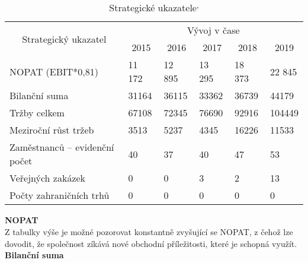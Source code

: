 \begin{table}[!hbtp]
\centering
\begin{tabular}{|l|lllll|}
\hline
\multicolumn{1}{|c|}{\multirow{2}{*}{Strategický ukazatel}} & \multicolumn{5}{c|}{Vývoj v čase} \\ \cline{2-6} 
\multicolumn{1}{|c|}{} & \multicolumn{1}{c|}{2015} & \multicolumn{1}{c|}{2016} & \multicolumn{1}{c|}{2017} & \multicolumn{1}{c|}{2018} & \multicolumn{1}{c|}{2019} \\ \hline
NOPAT (EBIT*0,81) & \multicolumn{1}{l|}{11 172} & \multicolumn{1}{l|}{12 895} & \multicolumn{1}{l|}{13 295} & \multicolumn{1}{l|}{18 373} & 22 845 \\ \hline
Bilanční suma & \multicolumn{1}{l|}{31164} & \multicolumn{1}{l|}{36115} & \multicolumn{1}{l|}{33362} & \multicolumn{1}{l|}{36739} & 44179 \\ \hline
Tržby celkem & \multicolumn{1}{l|}{67108} & \multicolumn{1}{l|}{72345} & \multicolumn{1}{l|}{76690} & \multicolumn{1}{l|}{92916} & 104449 \\ \hline
Meziroční růst tržeb & \multicolumn{1}{l|}{3513} & \multicolumn{1}{l|}{5237} & \multicolumn{1}{l|}{4345} & \multicolumn{1}{l|}{16226} & 11533 \\ \hline
Zaměstnanců – evidenční počet & \multicolumn{1}{l|}{40} & \multicolumn{1}{l|}{37} & \multicolumn{1}{l|}{40} & \multicolumn{1}{l|}{47} & 53 \\ \hline
Veřejných zakázek & \multicolumn{1}{l|}{0} & \multicolumn{1}{l|}{0} & \multicolumn{1}{l|}{3} & \multicolumn{1}{l|}{2} & 13 \\ \hline
Počty zahraničních trhů & \multicolumn{1}{l|}{0} & \multicolumn{1}{l|}{0} & \multicolumn{1}{l|}{0} & \multicolumn{1}{l|}{0} & 0 \\ \hline
\end{tabular}
\caption[Strategické ukazatele]{Strategické ukazatele\textsuperscript{,}}
\label{tab:Strategicke ukazatele}
\end{table}

\noindent\textbf{NOPAT}\\

Z tabulky výše je možné pozorovat konstantně zvyšující se NOPAT, z čehož lze dovodit, že společnost zíkává nové obchodní příležitosti, které je schopná využít.\\

\noindent\textbf{Bilanční suma}\\

